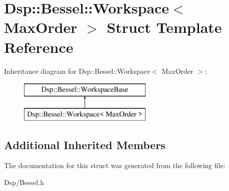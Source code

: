 \hypertarget{structDsp_1_1Bessel_1_1Workspace}{\section{Dsp\-:\-:Bessel\-:\-:Workspace$<$ Max\-Order $>$ Struct Template Reference}
\label{structDsp_1_1Bessel_1_1Workspace}
}
Inheritance diagram for Dsp\-:\-:Bessel\-:\-:Workspace$<$ Max\-Order $>$\-:\begin{figure}[H]
\begin{center}
\leavevmode
\includegraphics[height=2.000000cm]{structDsp_1_1Bessel_1_1Workspace}
\end{center}
\end{figure}
\subsection*{Additional Inherited Members}


The documentation for this struct was generated from the following file\-:\begin{DoxyCompactItemize}
\item 
Dsp/Bessel.\-h\end{DoxyCompactItemize}
